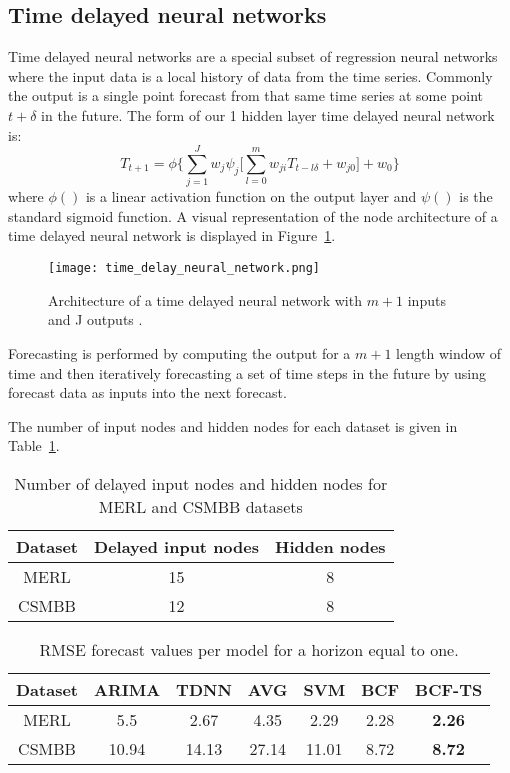 \subsection{Time delayed neural networks}

Time delayed neural networks are a special subset of regression neural networks where the input data is a local history of data from the time series.  Commonly the output is a single point forecast from that same time series at some point $t + \delta$ in the future.   The form of our 1 hidden layer time delayed neural network is:
\begin{equation}
T_{t + 1} = \phi \{ \sum_{j = 1}^{J} w_{j}\psi_{j} \bigg[ \sum_{l = 0}^{m}w_{ji}T_{t - l\delta} + w_{j0} \bigg] + w_0 \}
\end{equation}
\noindent where $\phi()$ is a linear activation function on the output layer and $\psi()$ is the standard sigmoid function.  A visual representation of the node architecture of a time delayed neural network is displayed in Figure~\ref{fig:tdnnarch}.

\begin{figure}[h]
	\centering
		\texttt{[image: time\_delay\_neural\_network.png]}
		\caption{Architecture of a time delayed neural network with $m + 1$ inputs and J outputs \cite{Hansen2003}.}
	\label{fig:tdnnarch}
\end{figure}

Forecasting is performed by computing the output for a $m + 1$ length window of time and then iteratively forecasting a set of time steps in the future by using forecast data as inputs into the next forecast. 

The number of input nodes and hidden nodes for each dataset is given in Table~\ref{fig:tdnntab}.

\begin{table}[h]
\centering
\caption{Number of delayed input nodes and hidden nodes for MERL and CSMBB datasets}
\begin{tabular}{|c|c|c|} \hline
Dataset & Delayed input nodes & Hidden nodes\\ \hline
MERL & 15 & 8\\ \hline
CSMBB & 12 & 8\\ \hline
\end{tabular}
\label{fig:tdnntab}
\end{table}


\begin{table}[t!]
\centering
\caption{RMSE forecast values per model for a horizon equal to one.}
\begin{tabular}{|c|c|c|c|c|c|c|} \hline
Dataset & ARIMA & TDNN & AVG & SVM & BCF & BCF-TS\\ \hline
MERL & 5.5 & 2.67 & 4.35 & 2.29 & 2.28 & \textbf{2.26}\\ \hline
CSMBB & 10.94 & 14.13 & 27.14 & 11.01 & 8.72 & \textbf{8.72}\\ \hline
\end{tabular}
\label{fig:rmsetab}
\end{table}

